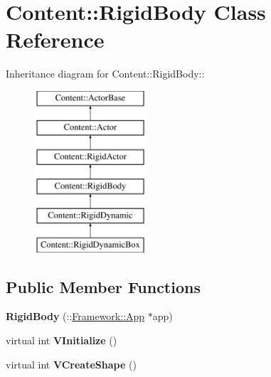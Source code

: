 \hypertarget{classContent_1_1RigidBody}{
\section{Content::RigidBody Class Reference}
\label{classContent_1_1RigidBody}
}
Inheritance diagram for Content::RigidBody::\begin{figure}[H]
\begin{center}
\leavevmode
\includegraphics[height=6cm]{classContent_1_1RigidBody}
\end{center}
\end{figure}
\subsection*{Public Member Functions}
\begin{DoxyCompactItemize}
\item 
\hypertarget{classContent_1_1RigidBody_a3d0d2f7e58cdeb85caadfb6127de40b0}{
{\bfseries RigidBody} (::\hyperlink{classFramework_1_1App}{Framework::App} $\ast$app)}
\label{classContent_1_1RigidBody_a3d0d2f7e58cdeb85caadfb6127de40b0}

\item 
\hypertarget{classContent_1_1RigidBody_a9383c7c604dd7ca5ec33780557ca777f}{
virtual int {\bfseries VInitialize} ()}
\label{classContent_1_1RigidBody_a9383c7c604dd7ca5ec33780557ca777f}

\item 
\hypertarget{classContent_1_1RigidBody_ad6666470df3ffc4fe018474b5a250205}{
virtual int {\bfseries VCreateShape} ()}
\label{classContent_1_1RigidBody_ad6666470df3ffc4fe018474b5a250205}

\end{DoxyCompactItemize}
